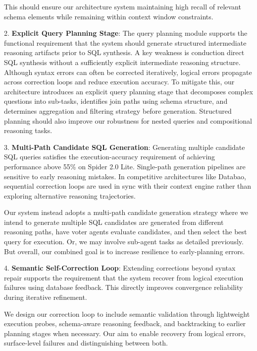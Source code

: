     This should ensure our architecture system maintaining high recall of relevant schema elements while remaining within context window constraints.

2. \textbf{Explicit Query Planning Stage}: The query planning module supports the functional requirement that the system should generate structured intermediate reasoning artifacts prior to SQL synthesis. A key weakness is conduction direct SQL synthesis without a sufficiently explicit intermediate reasoning structure. Although syntax errors can often be corrected iteratively, logical errors propagate across correction loops and reduce execution accuracy. To mitigate this, our architecture introduces an explicit query planning stage that decomposes complex questions into sub-tasks, identifies join paths using schema structure, and determines aggregation and filtering strategy before generation. Structured planning should also improve our robustness for nested queries and compositional reasoning tasks.

3. \textbf{Multi-Path Candidate SQL Generation}: Generating multiple candidate SQL queries satisfies the execution-accuracy requirement of achieving performance above 55\% on Spider 2.0 Lite. Single-path generation pipelines are sensitive to early reasoning mistakes. In competitive architectures like Databao, sequential correction loops are used in sync with their context engine rather than exploring alternative reasoning trajectories.

Our system instead adopts a multi-path candidate generation strategy where we intend to generate multiple SQL candidates are generated from different reasoning paths, have voter agents evaluate candidates, and then select the best query for execution. Or, we may involve sub-agent tasks as detailed previously. But overall, our combined goal is to increase resilience to early-planning errors.

4. \textbf{Semantic Self-Correction Loop}: Extending corrections beyond syntax repair supports the requirement that the system recover from logical execution failures using database feedback. This directly improves convergence reliability during iterative refinement.

We design our correction loop to include semantic validation through lightweight execution probes, schema-aware reasoning feedback, and backtracking to earlier planning stages when necessary. Our aim to enable recovery from logical errors, surface-level failures and distinguishing between both.


